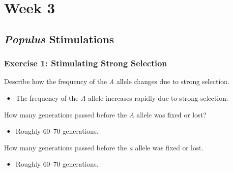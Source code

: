 \documentclass[12pt,a4paper]{article}
\begin{document}


\clearpage
\section*{Week 3}

\subsection{\textit{Populus} Stimulations}
\begin{enumerate}
    \subsubsection*{Exercise 1: Stimulating Strong Selection}
    {\color{darklc}\item  Describe how the frequency of the \textit{A} allele changes due to strong selection.}
        \begin{itemize}
            \item The frequency of the \textit{A} allele {\color{pos}increases rapidly} due to strong selection.
        \end{itemize}
    {\color{darklc}\item How many generations passed before the \textit{A} allele was fixed or lost?}
        \begin{itemize}
            \item Roughly {\color{o-Sun}60--70} generations.
        \end{itemize}
    {\color{darklc}\item How many generations passed before the \textit{a} allele was fixed or lost.}
        \begin{itemize}
            \item Roughly {\color{o-Sun}60--70} generations.
        \end{itemize}

\end{enumerate}
\end{document}
